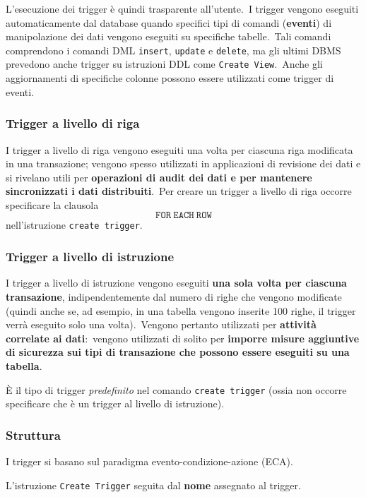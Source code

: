 \noindent L'esecuzione dei trigger è quindi trasparente all'utente.\
I trigger vengono eseguiti automaticamente dal database quando specifici tipi di comandi (\textbf{eventi}) di manipolazione dei dati vengono eseguiti su specifiche tabelle.\
Tali comandi comprendono i comandi DML \texttt{insert}, \texttt{update} e \texttt{delete}, ma gli ultimi DBMS prevedono anche trigger su istruzioni DDL come \texttt{Create View}.\
Anche gli aggiornamenti di specifiche colonne possono essere utilizzati come trigger di eventi.

\subsubsection{Trigger a livello di riga}

I trigger a livello di riga vengono eseguiti una volta per ciascuna riga modificata in una transazione; vengono spesso utilizzati in applicazioni di revisione dei dati e si rivelano utili per \textbf{operazioni di audit dei dati e per mantenere sincronizzati i dati distribuiti}.\
Per creare un trigger a livello di riga occorre specificare la clausola \[\mathtt{FOR\ EACH\ ROW}\] nell'istruzione \texttt{create trigger}.

\subsubsection{Trigger a livello di istruzione}

I trigger a livello di istruzione vengono eseguiti \textbf{una sola volta per ciascuna transazione}, indipendentemente dal numero di righe che vengono modificate (quindi anche se, ad esempio, in una tabella vengono inserite 100 righe, il trigger verrà eseguito solo una volta).\
Vengono pertanto utilizzati per \textbf{attività correlate ai dati}:\ vengono utilizzati di solito per \textbf{imporre misure aggiuntive di sicurezza sui tipi di transazione che possono essere eseguiti su una tabella}.\

È il tipo di trigger \textit{predefinito} nel comando \texttt{create trigger} (ossia non occorre specificare che è un trigger al livello di istruzione).

\subsubsection{Struttura}

I trigger si basano sul paradigma evento-condizione-azione (ECA).\

\noindent L'istruzione \texttt{Create Trigger} seguita dal \textbf{nome} assegnato al trigger.\

